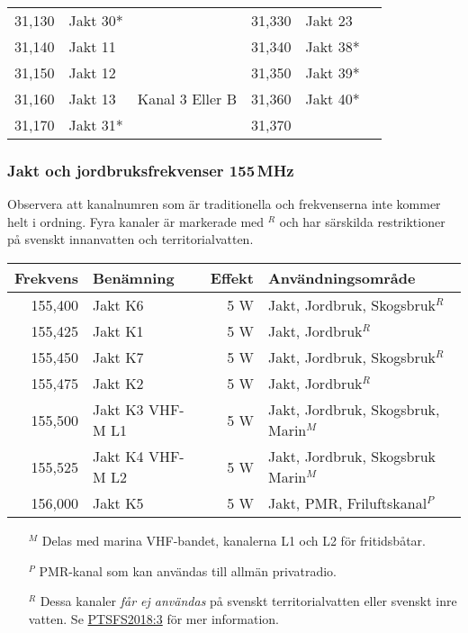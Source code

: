 \begin{longtable}{rll|rll}
	           31,130 & Jakt 30*           &                   &   31,330          &   Jakt 23          &                   \\
	           31,140 & Jakt 11            &                   &   31,340          &   Jakt 38*         &                   \\
	           31,150 & Jakt 12            &                   &   31,350          &   Jakt 39*        &                   \\
	           31,160 & Jakt 13            & Kanal 3 Eller B   &   31,360          &   Jakt 40*         &                   \\
	           31,170 & Jakt 31*           &                   &   31,370          &                    &
\end{longtable}


\subsubsection{Jakt och jordbruksfrekvenser 155\,MHz}

Observera att kanalnumren som är traditionella och frekvenserna inte kommer helt i ordning. Fyra kanaler är markerade med $^R$ och har särskilda restriktioner på svenskt innanvatten och territorialvatten.

\begin{tabular}{rlrl}
	\textbf{Frekvens} & \textbf{Benämning} & \textbf{Effekt} & \textbf{Användningsområde}           \\ \hline
	          155,400 & Jakt K6            &             5 W & Jakt, Jordbruk, Skogsbruk$^R$        \\
	          155,425 & Jakt K1            &             5 W & Jakt, Jordbruk$^R$                   \\
	          155,450 & Jakt K7            &             5 W & Jakt, Jordbruk, Skogsbruk$^R$        \\
	          155,475 & Jakt K2            &             5 W & Jakt, Jordbruk$^R$                   \\
	          155,500 & Jakt K3 VHF-M L1   &             5 W & Jakt, Jordbruk, Skogsbruk, Marin$^M$ \\
	          155,525 & Jakt K4 VHF-M L2   &             5 W & Jakt, Jordbruk, Skogsbruk Marin$^M$  \\
	          156,000 & Jakt K5            &             5 W & Jakt, PMR, Friluftskanal$^P$
\end{tabular}

\footnotesize
\begin{itemize}
	\item[$^M$] Delas med marina VHF-bandet, kanalerna L1 och L2 för fritidsbåtar.
	\item[$^P$] PMR-kanal som kan användas till allmän privatradio.
	\item[$^R$] Dessa kanaler \textit{får ej användas} på svenskt territorialvatten eller svenskt inre vatten. Se \href{https://pts.se/globalassets/startpage/dokument/legala-dokument/foreskrifter/radio/beslutade_ptsfs-2018-3-undantagsforeskrifter.pdf}{PTSFS2018:3} för mer information.
\end{itemize}
\normalsize

